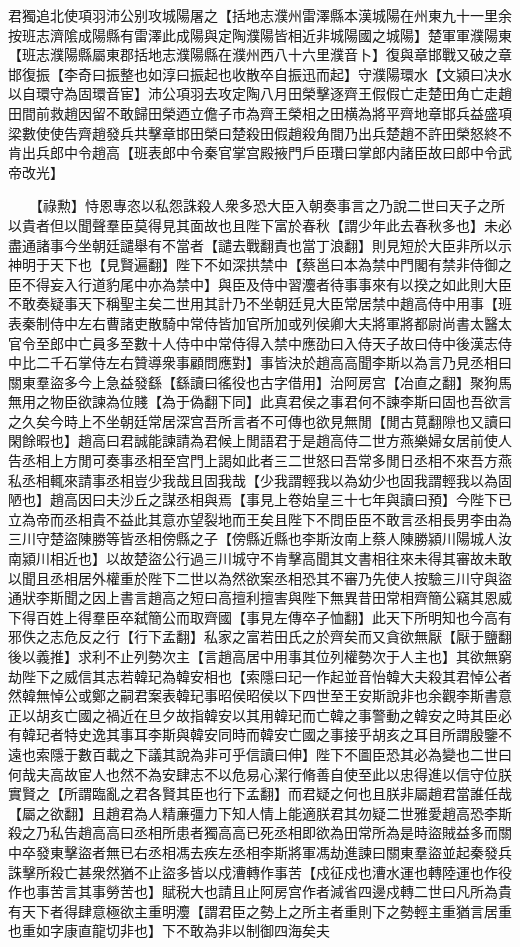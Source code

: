 君獨追北使項羽沛公别攻城陽屠之【括地志濮州雷澤縣本漢城陽在州東九十一里余按班志濟隂成陽縣有雷澤此成陽與定陶濮陽皆相近非城陽國之城陽】楚軍軍濮陽東【班志濮陽縣屬東郡括地志濮陽縣在濮州西八十六里濮音卜】復與章邯戰又破之章邯復振【李奇曰振整也如淳曰振起也收散卒自振迅而起】守濮陽環水【文潁曰决水以自環守為固環音宦】沛公項羽去攻定陶八月田榮擊逐齊王假假亡走楚田角亡走趙田間前救趙因留不敢歸田榮迺立儋子市為齊王榮相之田横為將平齊地章邯兵益盛項梁數使使告齊趙發兵共擊章邯田榮曰楚殺田假趙殺角間乃出兵楚趙不許田榮怒終不肯出兵郎中令趙高【班表郎中令秦官掌宫殿掖門戶臣瓚曰掌郎内諸臣故曰郎中令武帝改光】

　　【祿勲】恃恩專恣以私怨誅殺人衆多恐大臣入朝奏事言之乃說二世曰天子之所以貴者但以聞聲羣臣莫得見其面故也且陛下富於春秋【謂少年此去春秋多也】未必盡通諸事今坐朝廷譴舉有不當者【譴去戰翻責也當丁浪翻】則見短於大臣非所以示神明于天下也【見賢遍翻】陛下不如深拱禁中【蔡邕曰本為禁中門閣有禁非侍御之臣不得妄入行道豹尾中亦為禁中】與臣及侍中習灋者待事事來有以揆之如此則大臣不敢奏疑事天下稱聖主矣二世用其計乃不坐朝廷見大臣常居禁中趙高侍中用事【班表秦制侍中左右曹諸吏散騎中常侍皆加官所加或列侯卿大夫將軍將都尉尚書太醫太官令至郎中亡員多至數十人侍中中常侍得入禁中應劭曰入侍天子故曰侍中後漢志侍中比二千石掌侍左右贊導衆事顧問應對】事皆決於趙高高聞李斯以為言乃見丞相曰關東羣盜多今上急益發繇【繇讀曰徭役也古字借用】治阿房宫【冶直之翻】聚狗馬無用之物臣欲諫為位賤【為于偽翻下同】此真君侯之事君何不諫李斯曰固也吾欲言之久矣今時上不坐朝廷常居深宫吾所言者不可傳也欲見無閒【閒古莧翻隙也又讀曰閑餘暇也】趙高曰君誠能諫請為君候上閒語君于是趙高侍二世方燕樂婦女居前使人告丞相上方閒可奏事丞相至宫門上謁如此者三二世怒曰吾常多閒日丞相不來吾方燕私丞相輒來請事丞相豈少我哉且固我哉【少我謂輕我以為幼少也固我謂輕我以為固陋也】趙高因曰夫沙丘之謀丞相與焉【事見上卷始皇三十七年與讀曰預】今陛下已立為帝而丞相貴不益此其意亦望裂地而王矣且陛下不問臣臣不敢言丞相長男李由為三川守楚盜陳勝等皆丞相傍縣之子【傍縣近縣也李斯汝南上蔡人陳勝潁川陽城人汝南潁川相近也】以故楚盜公行過三川城守不肯擊高聞其文書相往來未得其審故未敢以聞且丞相居外權重於陛下二世以為然欲案丞相恐其不審乃先使人按驗三川守與盜通狀李斯聞之因上書言趙高之短曰高擅利擅害與陛下無異昔田常相齊簡公竊其恩威下得百姓上得羣臣卒弑簡公而取齊國【事見左傳卒子恤翻】此天下所明知也今高有邪佚之志危反之行【行下孟翻】私家之富若田氏之於齊矣而又貪欲無厭【厭于鹽翻後以義推】求利不止列勢次主【言趙高居中用事其位列權勢次于人主也】其欲無窮劫陛下之威信其志若韓玘為韓安相也【索隱曰玘一作起並音怡韓大夫殺其君悼公者然韓無悼公或鄭之嗣君案表韓玘事昭侯昭侯以下四世至王安斯說非也余觀李斯書意正以胡亥亡國之禍近在旦夕故指韓安以其用韓玘而亡韓之事警動之韓安之時其臣必有韓玘者特史逸其事耳李斯與韓安同時而韓安亡國之事接乎胡亥之耳目所謂殷鑒不遠也索隱于數百載之下議其說為非可乎信讀曰伸】陛下不圖臣恐其必為變也二世曰何哉夫高故宦人也然不為安肆志不以危易心潔行脩善自使至此以忠得進以信守位朕實賢之【所謂臨亂之君各賢其臣也行下孟翻】而君疑之何也且朕非屬趙君當誰任哉【屬之欲翻】且趙君為人精亷彊力下知人情上能適朕君其勿疑二世雅愛趙高恐李斯殺之乃私告趙高高曰丞相所患者獨高高已死丞相即欲為田常所為是時盜賊益多而關中卒發東擊盜者無已右丞相馮去疾左丞相李斯將軍馮劫進諫曰關東羣盜並起秦發兵誅擊所殺亡甚衆然猶不止盜多皆以戍漕轉作事苦【戍征戍也漕水運也轉陸運也作役作也事苦言其事勞苦也】賦税大也請且止阿房宫作者減省四邊戍轉二世曰凡所為貴有天下者得肆意極欲主重明灋【謂君臣之勢上之所主者重則下之勢輕主重猶言居重也重如字康直龍切非也】下不敢為非以制御四海矣夫